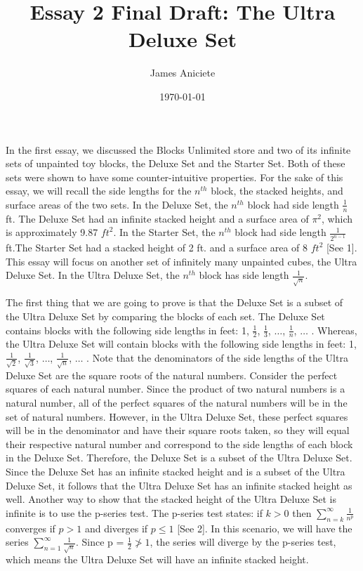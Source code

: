 \documentclass[12pt]{article}
\title{Essay 2 Final Draft: The Ultra Deluxe Set}
\author{James Aniciete}
\date{\today}
\begin{document}
\maketitle
In the first essay, we discussed the Blocks Unlimited store and two of its infinite sets of unpainted toy blocks, the Deluxe Set and the Starter Set. Both of these sets were shown to have some counter-intuitive properties. For the sake of this essay, we will recall the side lengths for the $n^{th}$ block, the stacked heights, and surface areas of the two sets. In the Deluxe Set, the $n^{th}$ block had side length $\frac1n$ ft. The Deluxe Set had an infinite stacked height and a surface area of $\pi^2$, which is approximately 9.87 ${ft}^2$. In the Starter Set, the  $n^{th}$ block had side length $\frac{1}{2^{n-1}}$ ft.The Starter Set had a stacked height of 2 ft. and a surface area of 8 ${ft}^2$ [See 1]. This essay will focus on another set of infinitely many unpainted cubes, the Ultra Deluxe Set. In the Ultra Deluxe Set, the $n^{th}$ block has side length $\frac{1}{\sqrt{n}}$. 

The first thing that we are going to prove is that the Deluxe Set is a subset of the Ultra Deluxe Set by comparing the blocks of each set. The Deluxe Set contains blocks with the following side lengths in feet: 1, $\frac12$, $\frac13$, $\ldots$,  $\frac1n$, $\ldots$ . Whereas, the Ultra Deluxe Set will contain blocks with the following side lengths in feet: 1, $\frac{1}{\sqrt{2}}$, $\frac{1}{\sqrt{3}}$, $\ldots$, $\frac{1}{\sqrt{n}}$, $\ldots$ . Note that the denominators of the side lengths of the Ultra Deluxe Set are the square roots of the natural numbers. Consider the perfect squares of each natural number. Since the product of two natural numbers is a natural number, all of the perfect squares of the natural numbers will be in the set of natural numbers. However, in the Ultra Deluxe Set, these perfect squares will be in the denominator and have their square roots taken, so they will equal their respective natural number and correspond to the side lengths of each block in the Deluxe Set. Therefore, the Deluxe Set is a subset of the Ultra Deluxe Set. Since the Deluxe Set has an infinite stacked height and is a subset of the Ultra Deluxe Set, it follows that the Ultra Deluxe Set has an infinite stacked height as well. Another way to show that the stacked height of the Ultra Deluxe Set is infinite is to use the p-series test. The p-series test states: if $k>0$ then $\sum_{n=k}^{\infty}\frac{1}{n^p}$ converges if $p>1$ and diverges if $p \leq 1$ [See 2]. In this scenario, we will have the series $\sum_{n=1}^{\infty}\frac{1}{\sqrt{n}}$. Since p = $\frac12 \ngtr1$, the series will diverge by the p-series test, which means the Ultra Deluxe Set will have an infinite stacked height.
\end{document}
